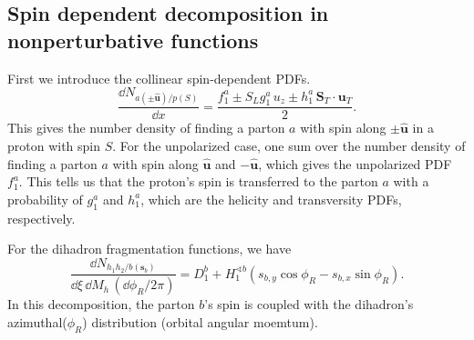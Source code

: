\documentclass[a4paper,11pt]{article}
\begin{document}
\subsection{Spin dependent decomposition in nonperturbative functions}

First we introduce the collinear spin-dependent PDFs.
\begin{equation}
     \frac{\dd N_{a(\pm\hat{\bm u})/p(S)}}{\dd x}
        =\frac{f_1^a\pm S_Lg_1^a\,u_z\pm h_1^a\,\bm S_T\cdot\bm u_T}{2}.
    \label{eq:sidis-pdf-density}
\end{equation}
This gives the number density of finding a parton $a$ with spin along $\pm\hat{\bm u}$ in a proton with spin $S$. For the unpolarized case, one sum over the number density of finding a parton $a$ with spin along $\hat{\bm u}$ and $-\hat{\bm u}$, which gives the unpolarized PDF $f_1^a$.
This tells us that the proton's spin is transferred to the parton $a$ with a probability of $g_1^a$ and $h_1^a$, which are the helicity and transversity PDFs, respectively.

For the dihadron fragmentation functions, we have
\begin{equation}
\frac{\dd N_{h_1h_2/b(\bm s_b)}}{\dd\xi\,\dd M_h\,(\dd\phi_R/2\pi)}
    =D_1^b+H_1^{\sphericalangle b}
                    (s_{b,y}\cos\phi_R-s_{b,x}\sin\phi_R).
    \label{eq:sidis-diff-density}
\end{equation}
In this decomposition, the parton $b$'s spin is coupled with the dihadron's azimuthal($\phi_R$) distribution (orbital angular moemtum).
\end{document}
